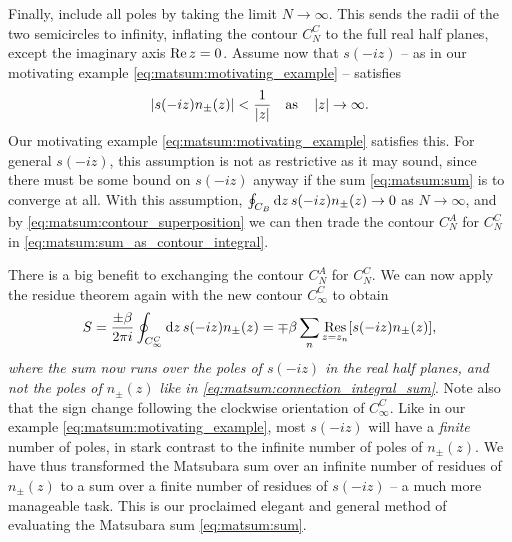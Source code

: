 Finally, include all poles by taking the limit $N \rightarrow \infty$.
This sends the radii of the two semicircles to infinity, inflating the contour $C_N^C$ to the full real half planes, except the imaginary axis $\operatorname{Re} z = 0$.
Assume now that $s(-i z)$ -- as in our motivating example \eqref{eq:matsum:motivating_example} -- satisfies
\begin{equation}
	\left\lvert s(-iz) n_\pm(z) \right\rvert < \frac{1}{\left\lvert z \right\rvert} \quad \text{as} \quad \left\lvert z \right\rvert \rightarrow \infty .
\end{equation}
Our motivating example \eqref{eq:matsum:motivating_example} satisfies this.
For general $s(-iz)$, this assumption is not as restrictive as it may sound, since there must be some bound on $s(-iz)$ anyway if the sum \eqref{eq:matsum:sum} is to converge at all.
With this assumption, $\oint_{C_B} \mathop{}\!\mathrm{d} z \, s(-iz) n_\pm(z) \rightarrow 0$ as $N \rightarrow \infty$, and by \cref{eq:matsum:contour_superposition} we can then trade the contour $C_N^A$ for $C_N^C$ in \cref{eq:matsum:sum_as_contour_integral}.

There is a big benefit to exchanging the contour $C_N^A$ for $C_N^C$.
We can now apply the residue theorem again with the new contour $C_\infty^C$ to obtain
\begin{equation}
	S = \frac{\pm \beta}{2 \pi i} \oint_{C_\infty^C} \mathop{}\!\mathrm{d} z \, s(-iz) n_\pm(z) = \mp \beta \sum_n \operatorname*{Res}_{z=z_n} [s(-iz) n_\pm(z)] ,
\label{eq:matsum:sum_finite_residues}
\end{equation}
\emph{where the sum now runs over the poles of $s(-iz)$ in the real half planes, and not the poles of $n_\pm(z)$ like in \cref{eq:matsum:connection_integral_sum}}.
Note also that the sign change following the clockwise orientation of $C_\infty^C$.
Like in our example \eqref{eq:matsum:motivating_example}, most $s(-iz)$ will have a \emph{finite} number of poles, in stark contrast to the infinite number of poles of $n_\pm(z)$.
We have thus transformed the Matsubara sum over an infinite number of residues of $n_\pm(z)$ to a sum over a finite number of residues of $s(-iz)$ -- a much more manageable task.
This is our proclaimed elegant and general method of evaluating the Matsubara sum \eqref{eq:matsum:sum}.

